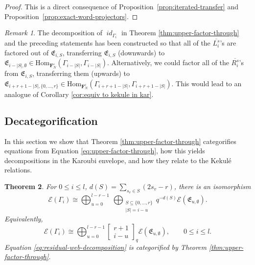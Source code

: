 \documentclass[12pt]{amsart}
\newtheorem{theorem}{Theorem}[section]
\theoremstyle{definition}
\theoremstyle{remark}
\newtheorem{remark}[theorem]{Remark}
\numberwithin{equation}{section}
\numberwithin{figure}{section}
\newcommand{\Z}{\mathbb{Z}}
\newcommand{\Q}{\mathbb{Q}}
\newcommand{\Hom}{\mathrm{Hom}}
\newcommand{\Kar}{\operatorname{Kar}}
\newcommand{\Li}[2]{\overline{L^{#1}_{#2}}}
\newcommand{\Ri}[2]{\overline{R^{#1}_{#2}}}
\newcommand{\Foam}{\mathbf{F}_N}
\newcommand{\osum}{\bigoplus}
\DeclareMathOperator{\idfoam}{\mathit{id}}
\begin{document}
\begin{proof}
This is a direct consequence of Proposition~\ref{prop:iterated-transfer} and Proposition~\ref{prop:exact-word-projectors}.
\end{proof}

\begin{remark}
    The decomposition of $\idfoam_{\Gamma_i}$ in Theorem \ref{thm:upper-factor-through} and the preceding statements has been constructed so that all of the $\Li{s}{i}$'s are factored out of $\mathfrak{E}_{i,S}$, transferring $\mathfrak{E}_{i,S}$ (downwards) to $\mathfrak{E}_{i- |S|, \emptyset} \in \Hom_{\Foam^\varepsilon}(\Gamma_{i- |S|}, \Gamma_{i- |S|})$. Alternatively, we could factor all of the $\Ri{s}{i}$'s from $\mathfrak{E}_{i,S}$, transferring them (upwards) to $\mathfrak{E}_{i + r +1 - |S|, \{0,\ldots,r\}} \in \Hom_{\Foam^\varepsilon}(\Gamma_{i + r +1 - |S|}, \Gamma_{i + r +1 - |S|})$. This would lead to an analogue of Corollary \ref{cor:equiv to kekule in kar}.
\end{remark}

\subsection{Decategorification}\label{sec:incidence}

In this section we show that Theorem \ref{thm:upper-factor-through}  categorifies equations from Equation \eqref{eq:upper-factor-through}, how this yields decompositions in the Karoubi envelope, and how they relate to the Kekulé relations.


\begin{theorem}\label{thm:incidence-convolution}
For $0\leq i\leq l$, $d(S)=\sum_{s_v \in S}(2s_v-r)$, there is an isomorphism 
\begin{equation}\label{eq:residual-web-decomposition}
 \mathcal E(\Gamma_i)\cong
 \bigoplus_{u=0}^{l-r-1}
 \ \bigoplus_{\substack{S\subseteq\{0,\ldots,r\}\\|S|=i-u}}
 q^{-d(S)}\mathcal E(\mathfrak{E}_{u,\emptyset}).
\end{equation}
Equivalently,
\begin{equation}\label{eq:incidence-convolution}
 \mathcal E(\Gamma_i) \cong
 \osum_{u=0}^{l-r-1}
 \begin{bmatrix}r+1\\i-u\end{bmatrix}_q \mathcal E(\mathfrak{E}_{u,\emptyset}),
 \qquad 0\leq i\leq l.
\end{equation}
Equation \eqref{eq:residual-web-decomposition} is categorified by Theorem \ref{thm:upper-factor-through}. 
\end{theorem}
\end{document}
